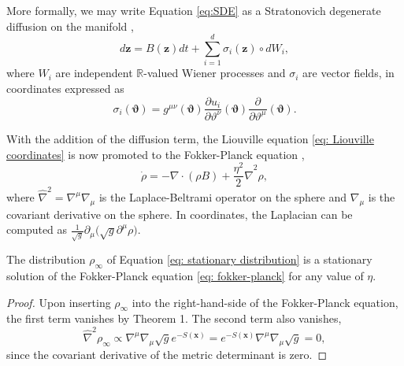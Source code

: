 \documentclass[tablecaption=bottom,wcp]{jmlr} %
\newcommand{\x}{\boldsymbol{x}}
\newcommand{\Z}{\boldsymbol{z}}
\newcommand{\Th}{\boldsymbol{\vartheta}}
\begin{document}
More formally, we may write Equation \eqref{eq:SDE} as a Stratonovich degenerate diffusion on the manifold \citep{elworthy, statequilibrium, DegenerateDiffusion},
\begin{equation} \label{eq: stratonovich}
    d \Z = B(\Z) dt + \sum_{i = 1}^d \sigma_i(\Z) \circ d W_i,
\end{equation}
where $W_i$ are independent $\mathbb{R}$-valued Wiener processes and $\sigma_i$ are vector fields, in coordinates expressed as
\begin{equation}
    \sigma_i(\Th) = g^{\mu \nu}(\Th) \frac{\partial u_i}{\partial \vartheta^{\nu}}(\Th) \frac{\partial}{\partial \vartheta^{\mu}}(\Th).
\end{equation}



With the addition of the diffusion term, the Liouville equation \eqref{eq: Liouville coordinates} is now promoted to the Fokker-Planck equation \citep{elworthyShort},
\begin{equation} \label{eq: fokker-planck}
    \dot{\rho} = - \nabla \cdot (\rho B) + \frac{\eta^2}{2} \widehat{\nabla}^{2}\rho ,
\end{equation}
where $\widehat{\nabla}^{2} = \nabla^{\mu} \nabla_{\mu}$ is the Laplace-Beltrami operator on the sphere and $\nabla_{\mu}$ is the covariant derivative on the sphere. In coordinates, the Laplacian can be computed as $\frac{1}{\sqrt{g}} \partial_{\mu} \big( \sqrt{g} \partial^{\mu} \rho \big)$.



\begin{theorem}
The distribution $\rho_{\infty}$ of Equation \eqref{eq: stationary distribution} is a stationary solution of the Fokker-Planck equation \eqref{eq: fokker-planck}
for any value of $\eta$.
\end{theorem}


\begin{proof}
Upon inserting $\rho_{\infty}$ into the right-hand-side of the Fokker-Planck equation, the first term vanishes by Theorem 1. The second term also vanishes,
\begin{equation*}
    \widehat{\nabla}^{2} \rho_{\infty} \propto \nabla^{\mu} \nabla_{\mu} \sqrt{g} e^{- S(\x)} = e^{- S(\x)} \nabla^{\mu} \nabla_{\mu} \sqrt{g} = 0,
\end{equation*}
since the covariant derivative of the metric determinant is zero. 
\end{proof}
\end{document}
